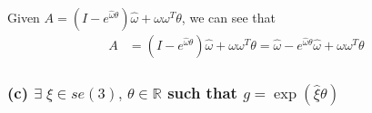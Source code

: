 Given \( A = \left(I-e^{\hat{\omega} \theta}\right) \hat{\omega}+\omega \omega^{T} \theta \), we can see that
\begin{align*}
      A
       & =
      \left(I-e^{\hat{\omega} \theta}\right) \hat{\omega}+\omega \omega^{T} \theta
      =
      \hat{\omega} - e^{\hat{\omega} \theta} \hat{\omega} + \omega \omega^{T} \theta
\end{align*}

\subsubsection*{(c) \( \exists \; \xi \in se(3), \, \theta \in \mathbb{R} \) such that \( g = \exp(\hat{\xi} \theta) \)}
